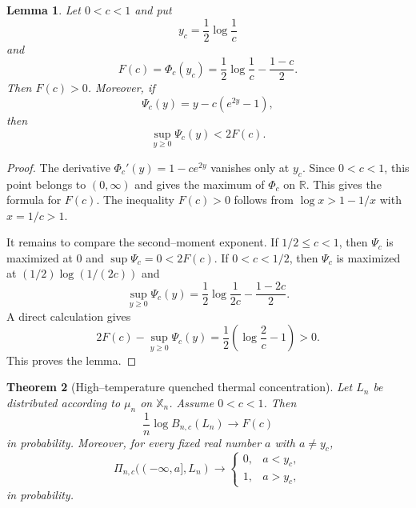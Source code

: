 \documentclass[a4paper,12pt]{article}
\newtheorem{thm}{Theorem}
\newtheorem{lem}[thm]{Lemma}
\theoremstyle{definition}
\theoremstyle{remark}
\newcommand{\re}{\mathbb R}
\begin{document}
\begin{lem}
\label{lem:laplace}
Let $0<c<1$ and put
$$
y_c=\frac{1}{2}\log\frac{1}{c}
$$
and
$$
F(c)=\Phi_c(y_c)=
\frac{1}{2}\log\frac{1}{c}-\frac{1-c}{2}.
$$
Then $F(c)>0$.
Moreover, if
$$
\Psi_c(y)=y-c(e^{2y}-1),
$$
then
$$
\sup_{y\ge0}\Psi_c(y)<2F(c).
$$
\end{lem}

\begin{proof}
The derivative $\Phi_c'(y)=1-ce^{2y}$ vanishes only at $y_c$.
Since $0<c<1$, this point belongs to $(0,\infty)$ and gives the maximum of $\Phi_c$ on $\re$.
This gives the formula for $F(c)$.
The inequality $F(c)>0$ follows from $\log x>1-1/x$ with $x=1/c>1$.

It remains to compare the second--moment exponent.
If $1/2\le c<1$, then $\Psi_c$ is maximized at $0$ and $\sup\Psi_c=0<2F(c)$.
If $0<c<1/2$, then $\Psi_c$ is maximized at $(1/2)\log(1/(2c))$ and
$$
\sup_{y\ge0}\Psi_c(y)=
\frac{1}{2}\log\frac{1}{2c}-\frac{1-2c}{2}.
$$
A direct calculation gives
$$
2F(c)-\sup_{y\ge0}\Psi_c(y)
=
\frac{1}{2}\left(\log\frac{2}{c}-1\right)>0.
$$
This proves the lemma.
\end{proof}

\begin{thm}[High--temperature quenched thermal concentration]
\label{thm:quenched}
Let $L_n$ be distributed according to $\mu_n$ on $\mathbb X_n$.
Assume $0<c<1$.
Then
$$
\frac{1}{n}\log B_{n,c}(L_n)\to F(c)
$$
in probability.
Moreover, for every fixed real number $a$ with $a\ne y_c$,
$$
\Pi_{n,c}((-\infty,a],L_n)\to
\begin{cases}
0, & a<y_c,\\
1, & a>y_c,
\end{cases}
$$
in probability.
\end{thm}
\end{document}
